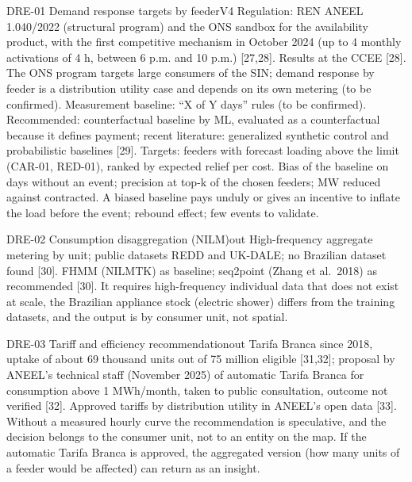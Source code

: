\begin{ficha}{DRE-01 \textperiodcentered{} Demand response targets by feeder}{V4}
 Regulation: REN ANEEL 1.040/2022 (structural program) and the ONS
sandbox for the availability product, with the first competitive mechanism in
October 2024 (up to 4 monthly activations of 4 h, between 6 p.m. and 10 p.m.)
[27,28]. Results at the CCEE [28]. The ONS program targets large consumers
of the SIN; demand response by feeder is a distribution utility case and depends
on its own metering (to be confirmed).
 Measurement baseline: ``X of Y days'' rules (to be
confirmed). Recommended: counterfactual baseline by ML, evaluated as a
counterfactual because it defines payment; recent literature: generalized
synthetic control and probabilistic baselines [29]. Targets: feeders with
forecast loading above the limit (CAR-01, RED-01), ranked by expected
relief per cost.
 Bias of the baseline on days without an event; precision at top-k of the
chosen feeders; MW reduced against contracted.
 A biased baseline pays unduly or gives an incentive to inflate
the load before the event; rebound effect; few events to validate.
\end{ficha}

\begin{ficha}{DRE-02 \textperiodcentered{} Consumption disaggregation (NILM)}{out}
 High-frequency aggregate metering by unit; public datasets
REDD and UK-DALE; no Brazilian dataset found [30].
 FHMM (NILMTK) as baseline; seq2point (Zhang et
al.\ 2018) as recommended [30].
 It requires high-frequency individual data that does not
exist at scale, the Brazilian appliance stock (electric shower) differs
from the training datasets, and the output is by consumer unit, not spatial.
\end{ficha}

\begin{ficha}{DRE-03 \textperiodcentered{} Tariff and efficiency recommendation}{out}
 Tarifa Branca since 2018, uptake of about 69 thousand units out of
75 million eligible [31,32]; proposal by ANEEL's technical staff (November 2025)
of automatic Tarifa Branca for consumption above 1 MWh/month, taken to public
consultation, outcome not verified [32]. Approved tariffs by distribution utility
in ANEEL's open data [33].
 Without a measured hourly curve the recommendation is
speculative, and the decision belongs to the consumer unit, not to an entity on the
map. If the automatic Tarifa Branca is approved, the aggregated version (how many
units of a feeder would be affected) can return as an insight.
\end{ficha}

